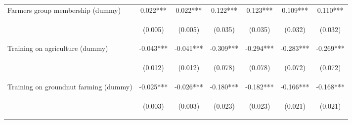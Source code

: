 \begin{center}
\begin{tabular}{lcccccc}
Farmers group membership (dummy) & 0.022*** & 0.022*** & 0.122*** & 0.123*** & 0.109*** & 0.110*** \\
\vspace{4pt} & \begin{footnotesize}(0.005)\end{footnotesize} & \begin{footnotesize}(0.005)\end{footnotesize} & \begin{footnotesize}(0.035)\end{footnotesize} & \begin{footnotesize}(0.035)\end{footnotesize} & \begin{footnotesize}(0.032)\end{footnotesize} & \begin{footnotesize}(0.032)\end{footnotesize} \\
Training on agriculture (dummy) & -0.043*** & -0.041*** & -0.309*** & -0.294*** & -0.283*** & -0.269*** \\
\vspace{4pt} & \begin{footnotesize}(0.012)\end{footnotesize} & \begin{footnotesize}(0.012)\end{footnotesize} & \begin{footnotesize}(0.078)\end{footnotesize} & \begin{footnotesize}(0.078)\end{footnotesize} & \begin{footnotesize}(0.072)\end{footnotesize} & \begin{footnotesize}(0.072)\end{footnotesize} \\
Training on groundnut farming (dummy) & -0.025*** & -0.026*** & -0.180*** & -0.182*** & -0.166*** & -0.168*** \\
\vspace{4pt} & \begin{footnotesize}(0.003)\end{footnotesize} & \begin{footnotesize}(0.003)\end{footnotesize} & \begin{footnotesize}(0.023)\end{footnotesize} & \begin{footnotesize}(0.023)\end{footnotesize} & \begin{footnotesize}(0.021)\end{footnotesize} & \begin{footnotesize}(0.021)\end{footnotesize} \\

\end{tabular}
\end{center}
